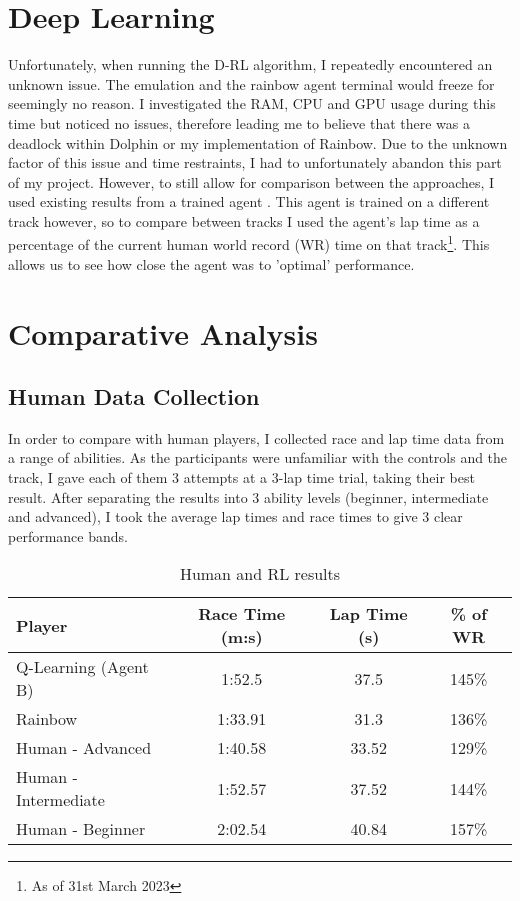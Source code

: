 \section{Deep Learning}
Unfortunately, when running the D-RL algorithm, I repeatedly encountered an unknown issue. The emulation and the rainbow agent terminal would freeze for seemingly no reason. I investigated the RAM, CPU and GPU usage during this time but noticed no issues, therefore leading me to believe that there was a deadlock within Dolphin or my implementation of Rainbow. Due to the unknown factor of this issue and time restraints, I had to unfortunately abandon this part of my project. However, to still allow for comparison between the approaches, I used existing results from a trained agent \cite{BenJMiddletonAgent}. This agent is trained on a different track however, so to compare between tracks I used the agent's lap time as a percentage of the current human world record (WR) time on that track\footnote{As of 31st March 2023}. This allows us to see how close the agent was to 'optimal' performance.
\section{Comparative Analysis}
\subsection{Human Data Collection}
In order to compare with human players, I collected race and lap time data from a range of abilities. As the participants were unfamiliar with the controls and the track, I gave each of them 3 attempts at a 3-lap time trial, taking their best result. After separating the results into 3 ability levels (beginner, intermediate and advanced), I took the average lap times and race times to give 3 clear performance bands.
\begin{table}[htb]
    \centering
    \begin{tabular}{l|c|c|c}
    \textbf{Player} & \textbf{Race Time (m:s)} & \textbf{Lap Time (s)}& \textbf{\% of WR}\\
    \hline
    Q-Learning (Agent B) & 1:52.5  &37.5 & 145\%\\
    Rainbow              & 1:33.91 & 31.3  & 136\% \\
    Human - Advanced     & 1:40.58 & 33.52 & 129\% \\
    Human - Intermediate & 1:52.57 & 37.52 & 144\% \\
    Human - Beginner     & 2:02.54 & 40.84 & 157\%
    \end{tabular}
    \caption{Human and RL results}
    \label{tab:lap-times}
\end{table}
